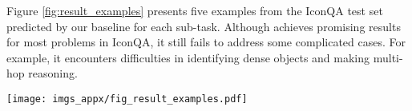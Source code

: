 \documentclass{article}
\begin{document}
Figure \ref{fig:result_examples} presents five examples from the IconQA test set predicted by our   baseline for each sub-task. Although  achieves promising results for most problems in IconQA, it still fails to address some complicated cases. For example, it encounters difficulties in identifying dense objects and making multi-hop reasoning.

\begin{figure*}[th!]
    \centering 
\texttt{[image: imgs\_appx/fig\_result\_examples.pdf]}
    \vspace{0mm}
    \caption{Result examples predicted by our  model in the IconQA test set. \textbf{Top}:  \textit{Multi-image-choice} sub-task. \textbf{Middle}: \textit{ Multi-text-choice} sub-task. \textbf{Bottom}: \textit{Filling-in-the-blank} sub-task. Correctly predicted answers are highlighted by green, while wrong ones are highlighted by red.}
\label{fig:result_examples}
\end{figure*}













\clearpage{}
\end{document}
